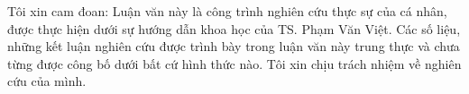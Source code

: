 Tôi xin cam đoan: Luận văn này là công trình nghiên cứu thực sự của cá nhân, được thực hiện dưới sự hướng dẫn khoa học của TS. Phạm Văn Việt. 
Các số liệu, những kết luận nghiên cứu được trình bày trong luận văn này trung thực và chưa từng được công bố dưới bất cứ hình thức nào.
Tôi xin chịu trách nhiệm về nghiên cứu của mình.


